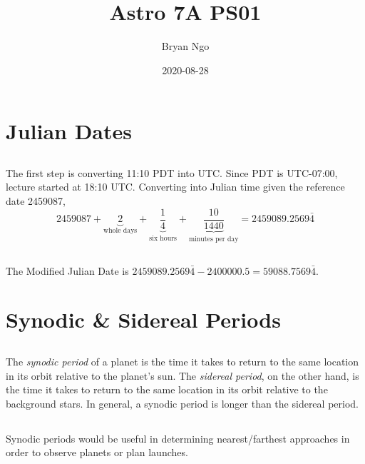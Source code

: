 \documentclass{article}
\title{Astro 7A PS01}
\author{Bryan Ngo}
\date{2020-08-28}
\begin{document}
\maketitle

\section{Julian Dates}

\subsection{}

The first step is converting 11:10 PDT into UTC.
Since PDT is UTC-07:00, lecture started at 18:10 UTC.
Converting into Julian time given the reference date 2459087,
\begin{equation}
    2459087 + \underbrace{2}_{\text{whole days}} + \underbrace{\frac{1}{4}}_{\text{six hours}} + \underbrace{\frac{10}{1440}}_{\text{minutes per day}} = 2459089.2569\bar{4}
\end{equation}

\subsection{}

The Modified Julian Date is \(2459089.2569\bar{4} - 2400000.5 = 59088.7569\bar{4}\).

\section{Synodic \& Sidereal Periods}

\subsection{}

The \emph{synodic period} of a planet is the time it takes to return to the same location in its orbit relative to the planet's sun.
The \emph{sidereal period}, on the other hand, is the time it takes to return to the same location in its orbit relative to the background stars.
In general, a synodic period is longer than the sidereal period.

\subsection{}

Synodic periods would be useful in determining nearest/farthest approaches in order to observe planets or plan launches.
\end{document}
